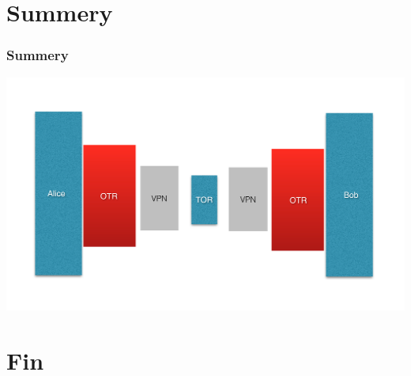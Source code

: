 \documentclass{beamer}
\begin{document}
\section{Summery}
\begin{frame}
\frametitle{Summery}
\begin{center}
\includegraphics[width=1\linewidth]{overview}
\end{center}
\end{frame}
\section{Fin}
\end{document}
